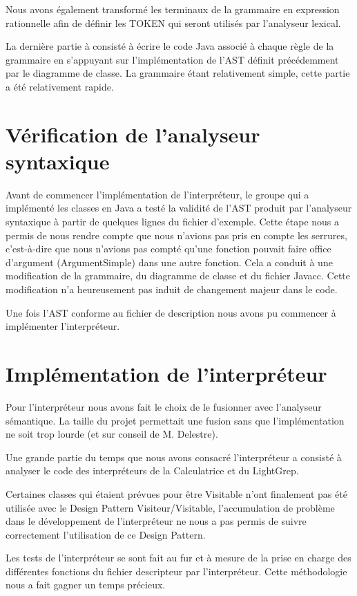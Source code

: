 Nous avons également transformé les terminaux de la grammaire en expression rationnelle afin de définir les TOKEN qui seront utilisés par l'analyseur lexical.

La dernière partie à consisté à écrire le code Java associé à chaque règle de la grammaire en s'appuyant sur l'implémentation de l'AST définit précédemment par le diagramme de classe. La grammaire étant relativement simple, cette partie a été relativement rapide.

\section{Vérification de l'analyseur syntaxique}
Avant de commencer l'implémentation de l'interpréteur, le groupe qui a implémenté les classes en Java a testé la validité de l'AST produit par l'analyseur syntaxique à partir de quelques lignes du fichier d'exemple. Cette étape nous a permis de nous rendre compte que nous n'avions pas pris en compte les serrures, c'est-à-dire que nous n'avions pas compté qu'une fonction pouvait faire office d'argument (ArgumentSimple) dans une autre fonction. Cela a conduit à une modification de la grammaire, du diagramme de classe et du fichier Javacc. Cette modification n'a heureusement pas induit de changement majeur dans le code. 

Une fois l'AST conforme au fichier de description nous avons pu commencer à implémenter l'interpréteur.

\section{Implémentation de l'interpréteur}
Pour l'interpréteur nous avons fait le choix de le fusionner avec l'analyseur sémantique. La taille du projet permettait une fusion sans que l'implémentation ne soit trop lourde (et sur conseil de M. Delestre).

Une grande partie du temps que nous avons consacré l'interpréteur a consisté à analyser le code des interpréteurs de la Calculatrice et du LightGrep.

Certaines classes qui étaient prévues pour être Visitable n'ont finalement pas été utilisée avec le Design Pattern Visiteur/Visitable, l'accumulation de problème dans le développement de l'interpréteur ne nous a pas permis de suivre correctement l'utilisation de ce Design Pattern.

Les tests de l'interpréteur se sont fait au fur et à mesure de la prise en charge des différentes fonctions du fichier descripteur par l'interpréteur. Cette méthodologie nous a fait gagner un temps précieux.

